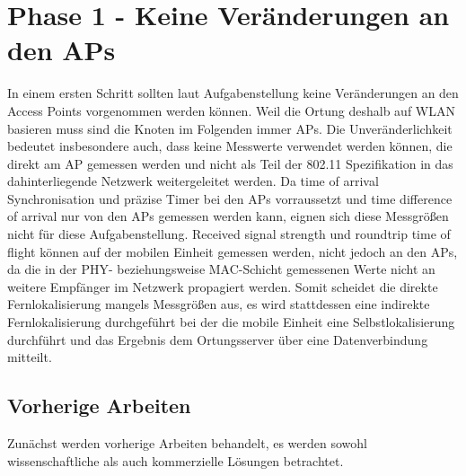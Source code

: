 \chapter{Phase 1 - Keine Veränderungen an den APs}
\label{ch:phase1}
In einem ersten Schritt sollten laut Aufgabenstellung keine Veränderungen an den Access Points vorgenommen werden können.
Weil die Ortung deshalb auf WLAN basieren muss sind die Knoten im Folgenden immer APs. 
Die Unveränderlichkeit bedeutet insbesondere auch, dass keine Messwerte verwendet werden können, die direkt am AP gemessen werden und nicht als Teil der 802.11 Spezifikation in das dahinterliegende Netzwerk weitergeleitet werden.
Da time of arrival Synchronisation und präzise Timer bei den APs vorraussetzt und time difference of arrival nur von den APs gemessen werden kann, eignen sich diese Messgrößen nicht für diese Aufgabenstellung.
Received signal strength und roundtrip time of flight können auf der mobilen Einheit gemessen werden, nicht jedoch an den APs, da die in der PHY- beziehungsweise MAC-Schicht gemessenen Werte nicht an weitere Empfänger im Netzwerk propagiert werden. 
Somit scheidet die direkte Fernlokalisierung mangels Messgrößen aus, es wird stattdessen eine indirekte Fernlokalisierung durchgeführt bei der die mobile Einheit eine Selbstlokalisierung durchführt und das Ergebnis dem Ortungsserver über eine Datenverbindung mitteilt.


\section{Vorherige Arbeiten}
\label{ch:phase1:sec:vorherige}
Zunächst werden vorherige Arbeiten behandelt, es werden sowohl wissenschaftliche als auch kommerzielle Lösungen betrachtet.


